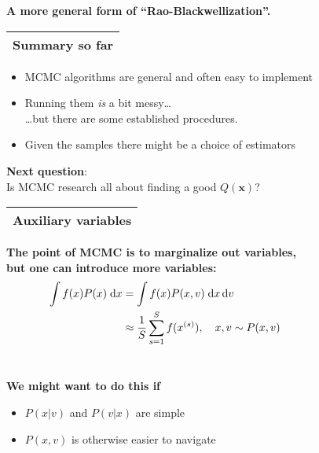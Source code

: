 \documentclass[25pt,landscape]{foils}
\newcommand{\Gray}{\textcolor{mygray}}
\newcommand{\Green}{\textcolor{mypine}}
\newcommand{\myfoilhead}[1]{
\newpage
\vspace*{-1cm}
\Gray{
\begin{tabular*}{\textwidth}{l}
{\bf \Huge #1} \\
\bottomrule
\end{tabular*}}}
\newcommand{\bx}{\mathbf{x}}
\begin{document}
\vfill
\textbf{A more general form of ``Rao-Blackwellization''.}

\myfoilhead{Summary so far}

\vfill

\begin{itemize}
    \setlength{\itemsep}{10pt}
    \setlength{\parskip}{10pt}
    \setlength{\parsep}{0cm}

\item MCMC algorithms are general and often easy to implement

\item Running them \emph{is} a bit messy\dots\\
    \dots but there are some established procedures.

\item Given the samples there might be a choice of estimators

\end{itemize}

\vfill
\vfill

\Green{\bf Next question}:\\
Is MCMC research all about finding a good $Q(\bx)$?

\myfoilhead{Auxiliary variables}

\vspace*{2cm}


{\bf The point of MCMC is to marginalize out variables,\\
but one can introduce more variables:}\\[-0.2in]
\[
\begin{split}
\int f(x) P(x) \;\mathrm{d}x
&= \int f(x) P(x,v) \;\mathrm{d}x\,\mathrm{d}v \\
&\approx \frac{1}{S} \sum_{s=1}^S f(x^{(s)}), \quad x,v\sim P(x,v) \hphantom{\mbox{ \emph{rejecting} } v\neq v_0}
\end{split}
\]\\[-0.2in]

\vfill

\Green{\bf We might want to do this if}
\begin{itemize}
    \item $P(x|v)$ and $P(v|x)$ are simple
    \item $P(x,v)$ is otherwise easier to navigate
\end{itemize}
\end{document}
